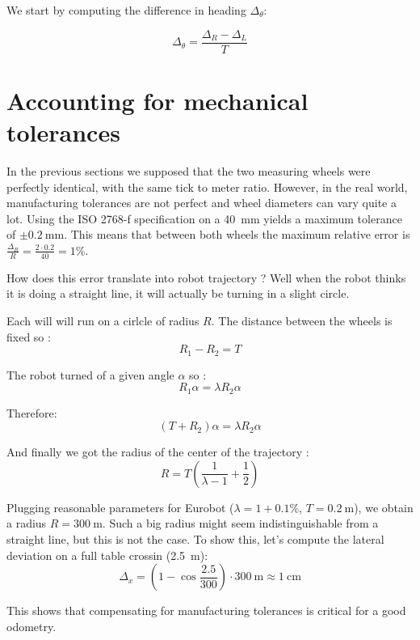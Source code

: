 \documentclass[a4paper]{IEEEtran}
\begin{document}
We start by computing the difference in heading $\Delta_\theta$:

\begin{equation}
    \Delta_\theta = \frac{\Delta_R - \Delta_L}{T}
\end{equation}

\section{Accounting for mechanical tolerances}
In the previous sections we supposed that the two measuring wheels were perfectly identical, with the same tick to meter ratio.
However, in the real world, manufacturing tolerances are not perfect and wheel diameters can vary quite a lot.
Using the ISO 2768-f specification on a \SI{40}{\milli\meter} yields a maximum tolerance of $\pm \SI{0.2}{\milli\meter}$.
This means that between both wheels the maximum relative error is $\frac{\Delta_R}{R} = \frac{2 \cdot 0.2}{40} = 1\% $.

How does this error translate into robot trajectory ?
Well when the robot thinks it is doing a straight line, it will actually be turning in a slight circle.

Each will will run on a cirlcle of radius $R$.
The distance between the wheels is fixed so :
\begin{equation}
    R_1 - R_2 = T
\end{equation}

The robot turned of a given angle $\alpha$ so :
\begin{equation}
    R_1 \alpha = \lambda R_2 \alpha
\end{equation}

Therefore:
\begin{equation}
    (T + R_2) \alpha = \lambda R_2 \alpha
\end{equation}

And finally we got the radius of the center of the trajectory :
\begin{equation}
    R = T \left(\frac{1}{\lambda - 1}  + \frac{1}{2}\right)
\end{equation}

Plugging reasonable parameters for Eurobot ($\lambda=1+0.1\%$, $T = \SI{0.2}{\meter}$), we obtain a radius $R = \SI{300}{\meter}$. 
Such a big radius might seem indistinguishable from a straight line, but this is not the case.
To show this, let's compute the lateral deviation on a full table crossin (\SI{2.5}{\meter}):
\begin{equation}
    \Delta_x = \left( 1 - \cos \frac{2.5}{300} \right) \cdot \SI{300}{\meter} \approx \SI{1}{\centi\meter}
\end{equation}

This shows that compensating for manufacturing tolerances is critical for a good odometry.
\end{document}
